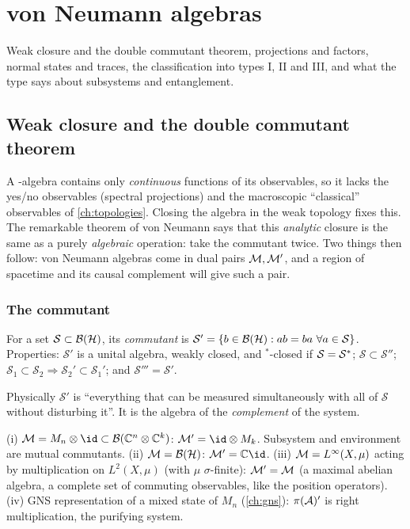 \chapter{von Neumann algebras}\label{ch:vn}

Weak closure and the double commutant theorem, projections and factors, normal states and traces, the classification into types I, II and III, and what the type says about subsystems and entanglement.

\section{Weak closure and the double commutant theorem}\label{ch:doublecomm}

\begin{physmotiv}
A \cstar-algebra contains only \emph{continuous} functions of its observables, so it lacks the yes/no observables (spectral projections) and the macroscopic ``classical'' observables of \cref{ch:topologies}. Closing the algebra in the weak topology fixes this. The remarkable theorem of von Neumann says that this \emph{analytic} closure is the same as a purely \emph{algebraic} operation: take the commutant twice. Two things then follow: von Neumann algebras come in dual pairs $\mathcal{M},\mathcal{M}'$, and a region of spacetime and its causal complement will give such a pair.
\end{physmotiv}

\subsection{The commutant}

For a set $\mathcal S\subset\mathcal{B}(\mathcal{H})$, its \emph{commutant} is $\mathcal S'=\{b\in\mathcal{B}(\mathcal{H}):ab=ba\ \forall a\in\mathcal S\}$. Properties: $\mathcal S'$ is a unital algebra, weakly closed, and $^*$-closed if $\mathcal S=\mathcal S^{*}$; $\mathcal S\subset\mathcal S''$; $\mathcal S_1\subset\mathcal S_2\Rightarrow\mathcal S_2'\subset\mathcal S_1'$; and $\mathcal S'''=\mathcal S'$.

Physically $\mathcal S'$ is ``everything that can be measured simultaneously with all of $\mathcal S$ without disturbing it''. It is the algebra of the \emph{complement} of the system.

\begin{example}
(i) $\M=M_n\otimes\id\subset\Bnd{\C^n\otimes\C^k}$: $\M'=\id\otimes M_k$. Subsystem and environment are mutual commutants. (ii) $\mathcal{M}=\mathcal{B}(\mathcal{H})$: $\M'=\C\id$. (iii) $\mathcal{M}=L^\infty(X,\mu)$ acting by multiplication on $L^2(X,\mu)$ (with $\mu$ $\sigma$-finite): $\mathcal{M}'=\mathcal{M}$ (a maximal abelian algebra, a complete set of commuting observables, like the position operators). (iv) GNS representation of a mixed state of $M_n$ (\cref{ch:gns}): $\pi(\mathcal{A})'$ is right multiplication, the purifying system.
\end{example}

